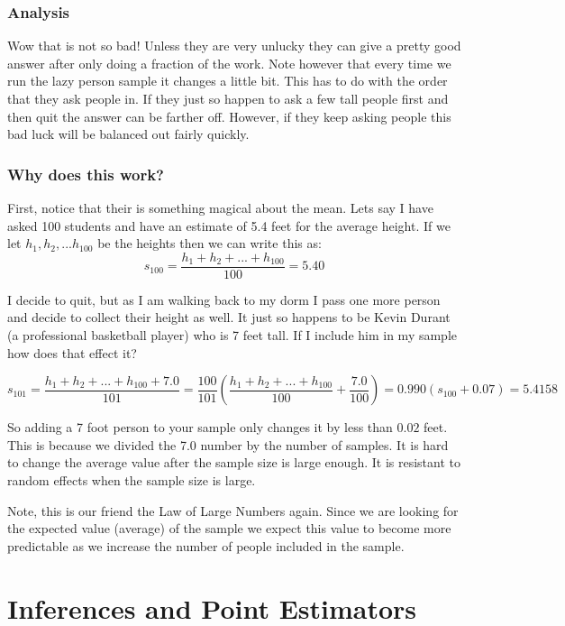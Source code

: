 \documentclass[
]{book}
\theoremstyle{definition}
\theoremstyle{definition}
\theoremstyle{definition}
\theoremstyle{definition}
\theoremstyle{remark}
\begin{document}
\hypertarget{analysis}{%
\subsubsection{Analysis}\label{analysis}}

Wow that is not so bad! Unless they are very unlucky they can give a pretty good answer after only doing a fraction of the work. Note however that every time we run the lazy person sample it changes a little bit. This has to do with the order that they ask people in. If they just so happen to ask a few tall people first and then quit the answer can be farther off. However, if they keep asking people this bad luck will be balanced out fairly quickly.

\hypertarget{why-does-this-work}{%
\subsubsection{Why does this work?}\label{why-does-this-work}}

First, notice that their is something magical about the mean. Lets say I have asked 100 students and have an estimate of 5.4 feet for the average height. If we let \(h_1, h_2,...h_{100}\) be the heights then we can write this as:
\[s_{100}=\frac{h_1+h_2+...+h_{100}}{100}=5.40\]

I decide to quit, but as I am walking back to my dorm I pass one more person and decide to collect their height as well. It just so happens to be Kevin Durant (a professional basketball player) who is 7 feet tall. If I include him in my sample how does that effect it?

\[s_{101}=\frac{h_1+h_2+...+h_{100}+7.0}{101}=\frac{100}{101}\left(\frac{h_1+h_2+...+h_{100}}{100}+\frac{7.0}{100}\right)=0.990(s_{100}+0.07)=5.4158\]

So adding a 7 foot person to your sample only changes it by less than \(0.02\) feet. This is because we divided the 7.0 number by the number of samples. It is hard to change the average value after the sample size is large enough. It is resistant to random effects when the sample size is large.

Note, this is our friend the Law of Large Numbers again. Since we are looking for the expected value (average) of the sample we expect this value to become more predictable as we increase the number of people included in the sample.

\hypertarget{inferences-and-point-estimators}{%
\section{Inferences and Point Estimators}\label{inferences-and-point-estimators}}
\end{document}
